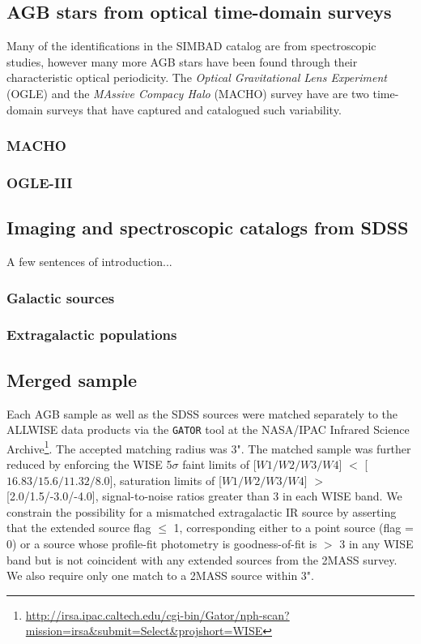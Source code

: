 \subsection{AGB stars from optical time-domain surveys}
Many of the identifications in the SIMBAD catalog are from spectroscopic studies, however many more AGB stars have been found through their characteristic optical periodicity. The \emph{Optical Gravitational Lens Experiment} (OGLE) and the \emph{MAssive Compacy Halo} (MACHO) survey have are two time-domain surveys that have captured and catalogued such variability.

\subsubsection{MACHO}

\subsubsection{OGLE-III}

\subsection{Imaging and spectroscopic catalogs from SDSS}
A few sentences of introduction...
\subsubsection{Galactic sources} 
\subsubsection{Extragalactic populations} 

\subsection{Merged sample}
Each AGB sample as well as the SDSS sources were matched separately to the ALLWISE data products via the {\tt GATOR} tool at the NASA/IPAC Infrared Science Archive\footnote{\url{http://irsa.ipac.caltech.edu/cgi-bin/Gator/nph-scan?mission=irsa&submit=Select&projshort=WISE}}. The accepted matching radius was 3". The matched sample was further reduced by enforcing the WISE 5$\sigma$ faint limits of [$W1/W2/W3/W4$] $<$ [$16.83/15.6/11.32/8.0$], saturation limits of [$W1/W2/W3/W4$] $>$ [2.0/1.5/-3.0/-4.0], signal-to-noise ratios greater than 3 in each WISE band. We constrain the possibility for a mismatched extragalactic IR source by asserting that the extended source flag $\le$ 1, corresponding either to a point source (flag = 0) or a source whose profile-fit photometry is goodness-of-fit is $>$ 3 in any WISE band but is not coincident with any extended sources from the 2MASS survey. We also require only one match to a 2MASS source within 3".

